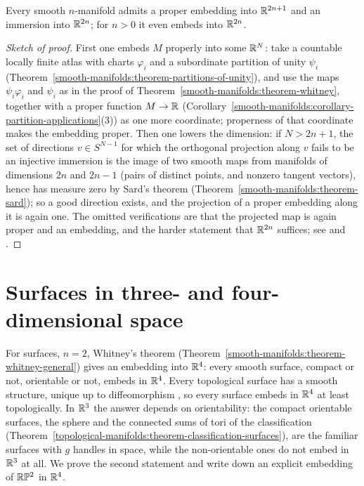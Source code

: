 \begin{theorem}[Whitney]\label{smooth-manifolds:theorem-whitney-general}
Every smooth $n$-manifold admits a proper embedding into $\mathbb{R}^{2n+1}$ and an immersion into $\mathbb{R}^{2n}$; for $n > 0$ it even embeds into $\mathbb{R}^{2n}$.
\end{theorem}

\begin{proof}[Sketch of proof]
First one embeds $M$ properly into some $\mathbb{R}^N$: take a countable locally finite atlas with charts $\varphi_i$ and a subordinate partition of unity $\psi_i$
(Theorem~\ref{smooth-manifolds:theorem-partitions-of-unity}), and use the maps $\psi_i\varphi_i$ and $\psi_i$ as in the proof of
Theorem~\ref{smooth-manifolds:theorem-whitney}, together with a proper function $M \to \mathbb{R}$
(Corollary~\ref{smooth-manifolds:corollary-partition-applications}(3)) as one more coordinate; properness of that coordinate makes the embedding proper. Then one
lowers the dimension: if $N > 2n + 1$, the set of directions $v \in S^{N-1}$ for which the orthogonal projection along $v$ fails to be an injective immersion is
the image of two smooth maps from manifolds of dimensions $2n$ and $2n - 1$ (pairs of distinct points, and nonzero tangent vectors), hence has measure zero by
Sard's theorem (Theorem~\ref{smooth-manifolds:theorem-sard}); so a good direction exists, and the projection of a proper embedding along it is again one. The
omitted verifications are that the projected map is again proper and an embedding, and the harder statement that $\mathbb{R}^{2n}$ suffices; see
\cite[Chapter 1]{hirsch-differential-topology} and \cite[Chapter 6]{lee-smooth-manifolds}.
\end{proof}

\section{Surfaces in three- and four-dimensional space}\label{smooth-manifolds:section-surfaces-embeddings}

For surfaces, $n = 2$, Whitney's theorem (Theorem~\ref{smooth-manifolds:theorem-whitney-general}) gives an embedding into $\mathbb{R}^4$: every smooth surface, compact or not, orientable or not, embeds in $\mathbb{R}^4$. Every
topological surface has a smooth structure, unique up to diffeomorphism \cite{moise-1977}, so every surface embeds in $\mathbb{R}^4$ at least topologically. In $\mathbb{R}^3$ the answer depends on orientability: the compact
orientable surfaces, the sphere and the connected sums of tori of the classification (Theorem~\ref{topological-manifolds:theorem-classification-surfaces}), are the familiar surfaces with $g$ handles in space, while the
non-orientable ones do not embed in $\mathbb{R}^3$ at all. We prove the second statement and write down an explicit embedding of $\mathbb{R}\mathbb{P}^2$ in $\mathbb{R}^4$.

